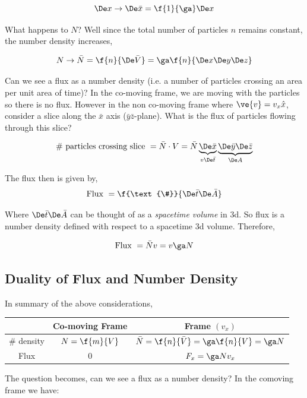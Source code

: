 \documentclass{article}
\begin{document}
\[ \De x \to \De \bar{x} = \f{1}{\ga} \De x \]

What happens to $N$? Well since the total number of particles $n$ remains constant, the number density increases,

\[ N \to \bar{N} = \f{n}{\De \bar{V}} = \ga \f{n}{\De x\De y\De z} \]

Can we see a flux as a number density (i.e. a number of particles crossing an area per unit area of time)? In the co-moving frame, we are moving with the particles so there is no flux. However in the non co-moving frame where $\ve{v} = v_x \hat{x}$, consider a slice along the $\bar{x}$ axis ($\bar{y}\bar{z}$-plane). What is the flux of particles flowing through this slice?

\[ \text{\# particles crossing slice } = \bar{N} \cdot V = \bar{N} \underbrace{\De \bar{x}}_{v\De \bar{t}} \underbrace{\De \bar{y} \De \bar{z}}_{\De A} \]

The flux then is given by,
\[ \text{Flux } = \f{\text{\#}}{\De \bar{t} \De \bar{A}} \]

Where $\De \bar{t} \De \bar{A}$ can be thought of as a \textit{spacetime volume} in 3d. So flux is a number density defined with respect to a spacetime 3d volume. Therefore,

\[ \text{Flux } = \bar{N} v = v \ga N \]

\subsection{Duality of Flux and Number Density}

In summary of the above considerations,

\begin{center}
\begin{tabular}{|c|c|c|}
    \hline
    & Co-moving Frame & Frame $(v_x)$ \\
    \hline
    \# density & $N = \f{m}{V}$ & $\bar{N} = \f{n}{\bar{V}}= \ga \f{n}{V} = \ga N$ \\
    \hline
    Flux & $0$ & $F_x = \ga N v_x$ \\
    \hline
\end{tabular}
\end{center}

The question becomes, can we see a flux as a number density? In the comoving frame we have:
\end{document}
